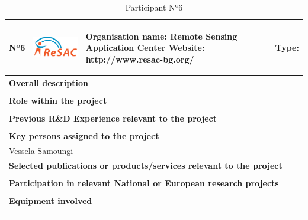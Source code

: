 \begin{longtable}[H]{|p{0.7cm}|p{4cm}|p{7cm}|p{1.3cm}|}
	\hline
	\begin{center} Nº6 \end{center} & \begin{center} \includegraphics[scale=1.2]{./logos/logo_resac} \end{center} & \begin{center} \textbf{Organisation name:} Remote Sensing Application Center \newline \textbf{Website:} http://www.resac-bg.org/ \end{center} & \begin{center} Type: \end{center} \\ \hline
	
	\multicolumn{4}{|p{13cm}|}{\textbf{Overall description}}  \\ \hline
	
	\multicolumn{4}{|p{13cm}|}{}  \\ \hline
	
	\multicolumn{4}{|p{13cm}|}{\textbf{Role within the project}}   \\ \hline
	
	\multicolumn{4}{|p{13cm}|}{}  \\ \hline
	
	\multicolumn{4}{|p{13cm}|}{\textbf{Previous R\&D Experience relevant to the project}}  \\ \hline
	
	\multicolumn{4}{|p{13cm}|}{}  \\ \hline
	
	\multicolumn{4}{|p{13cm}|}{\textbf{Key persons assigned to the project}}   \\ \hline
	
	\multicolumn{4}{|p{13cm}|}{Vessela Samoungi}  \\ \hline
	
	\multicolumn{4}{|p{13cm}|}{\textbf{Selected publications or products/services relevant to the project}}  \\ \hline
	
	\multicolumn{4}{|p{13cm}|}{}  \\ \hline
	
	\multicolumn{4}{|p{13cm}|}{\textbf{Participation in relevant National or European research projects}}  \\ \hline
	
	\multicolumn{4}{|p{13cm}|}{}  \\ \hline
	
	\multicolumn{4}{|p{13cm}|}{\textbf{Equipment involved}}  \\ \hline
	
	\multicolumn{4}{|p{13cm}|}{}  \\ \hline
	\caption{Participant Nº6}
\end{longtable}

